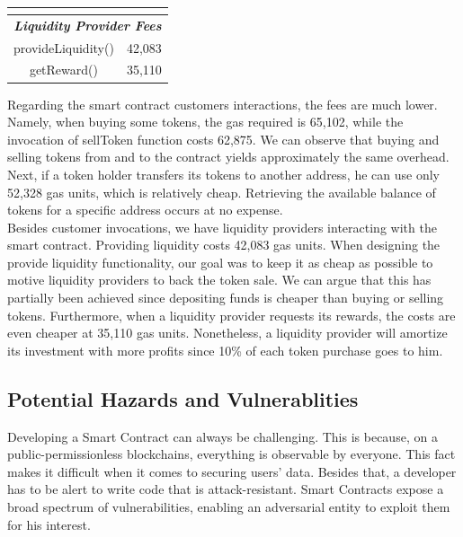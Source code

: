 \documentclass[12pt,a4paper]{article}
\begin{document}
\begin{table}[htpb]
\begin{center}
\begin{tabular}{cc}
        \multicolumn{1}{l}{}                                               & \multicolumn{1}{l}{}             \\ \hline
        \multicolumn{2}{|c|}{\textit{\textbf{Liquidity Provider Fees}}}                                       \\ \hline   
        \multicolumn{1}{|c|}{provideLiquidity()}                           & \multicolumn{1}{c|}{42,083}   \\ \hline
        \multicolumn{1}{|c|}{getReward()}                                  & \multicolumn{1}{c|}{35,110}   \\ \hline
        \end{tabular}
    \end{center}
\end{table}

Regarding the smart contract customers interactions, the fees are much lower.
Namely, when buying some tokens, the gas required is 65,102, while the
invocation of sellToken function costs 62,875. We can observe that buying and
selling tokens from and to the contract yields approximately the same overhead.
Next, if a token holder transfers its tokens to another address, he can use only
52,328 gas units, which is relatively cheap. Retrieving the available balance of
tokens for a specific address occurs at no expense. \\

Besides customer invocations, we have liquidity providers interacting with the
smart contract. Providing liquidity costs 42,083 gas units. When designing the
provide liquidity functionality, our goal was to keep it as cheap as possible to
motive liquidity providers to back the token sale. We can argue that this has
partially been achieved since depositing funds is cheaper than buying or selling
tokens. Furthermore, when a liquidity provider requests its rewards, the costs
are even cheaper at 35,110 gas units. Nonetheless, a liquidity provider will
amortize its investment with more profits since 10\% of each token purchase goes
to him. 

\subsection*{Potential Hazards and Vulnerablities}

Developing a Smart Contract can always be challenging. This is because, on a public-permissionless blockchains, everything is observable by everyone. This fact makes it difficult when it comes to securing users’ data. Besides that, a developer has to be alert to write code that is attack-resistant. Smart Contracts expose a broad spectrum of vulnerabilities, enabling an adversarial entity to exploit them for his interest.\\
\end{document}
